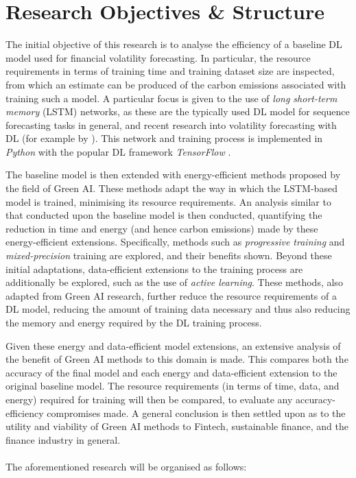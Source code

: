\documentclass[a4paper, 11pt]{report}
\begin{document}
    \section{Research Objectives \& Structure}
    \label{section: structure}

    The initial objective of this research is to analyse the efficiency of a baseline DL model used for financial volatility forecasting. In particular, the resource requirements in terms of training time and training dataset size are inspected, from which an estimate can be produced of the carbon emissions associated with training such a model. A particular focus is given to the use of \emph{long short-term memory} (LSTM) networks, as these are the typically used DL model for sequence forecasting tasks in general, and recent research into volatility forecasting with DL (for example by \citet{xiong-2015}). This network and training process is implemented in \emph{Python} with the popular DL framework \emph{TensorFlow} \citep{abadi-2016}.

    The baseline model is then extended with energy-efficient methods proposed by the field of Green AI. These methods adapt the way in which the LSTM-based model is trained, minimising its resource requirements. An analysis similar to that conducted upon the baseline model is then conducted, quantifying the reduction in time and energy (and hence carbon emissions) made by these energy-efficient extensions. Specifically, methods such as \emph{progressive training} and \emph{mixed-precision} training are explored, and their benefits shown. Beyond these initial adaptations, data-efficient extensions to the training process are additionally be explored, such as the use of \emph{active learning}. These methods, also adapted from Green AI research, further reduce the resource requirements of a DL model, reducing the amount of training data necessary and thus also reducing the memory and energy required by the DL training process.

    Given these energy and data-efficient model extensions, an extensive analysis of the benefit of Green AI methods to this domain is made. This compares both the accuracy of the final model and each energy and data-efficient extension to the original baseline model. The resource requirements (in terms of time, data, and energy) required for training will then be compared, to evaluate any accuracy-efficiency compromises made. A general conclusion is then settled upon as to the utility and viability of Green AI methods to Fintech, sustainable finance, and the finance industry in general.
    \\ \\
    The aforementioned research will be organised as follows: 
\end{document}

